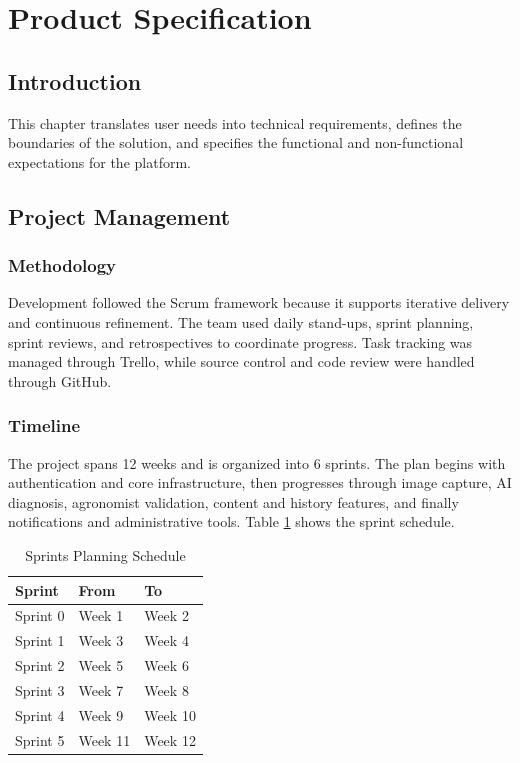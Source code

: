 \documentclass[12pt]{article}
\begin{document}
\newpage
\section{Product Specification}

\subsection{Introduction}
This chapter translates user needs into technical requirements, defines the boundaries of the solution, and specifies the functional and non-functional expectations for the platform.

\subsection{Project Management}

\subsubsection{Methodology}
Development followed the Scrum framework because it supports iterative delivery and continuous refinement. The team used daily stand-ups, sprint planning, sprint reviews, and retrospectives to coordinate progress. Task tracking was managed through Trello, while source control and code review were handled through GitHub.

\subsubsection{Timeline}
The project spans 12 weeks and is organized into 6 sprints. The plan begins with authentication and core infrastructure, then progresses through image capture, AI diagnosis, agronomist validation, content and history features, and finally notifications and administrative tools. Table \ref{tab:sprints} shows the sprint schedule.

\begin{table}[h]
\centering
\caption{Sprints Planning Schedule}
\label{tab:sprints}
\begin{tabular}{|l|l|l|}
\hline
\textbf{Sprint} & \textbf{From} & \textbf{To} \\
\hline
Sprint 0 & Week 1 & Week 2 \\
Sprint 1 & Week 3 & Week 4 \\
Sprint 2 & Week 5 & Week 6 \\
Sprint 3 & Week 7 & Week 8 \\
Sprint 4 & Week 9 & Week 10 \\
Sprint 5 & Week 11 & Week 12 \\
\hline
\end{tabular}
\end{table}
\end{document}
